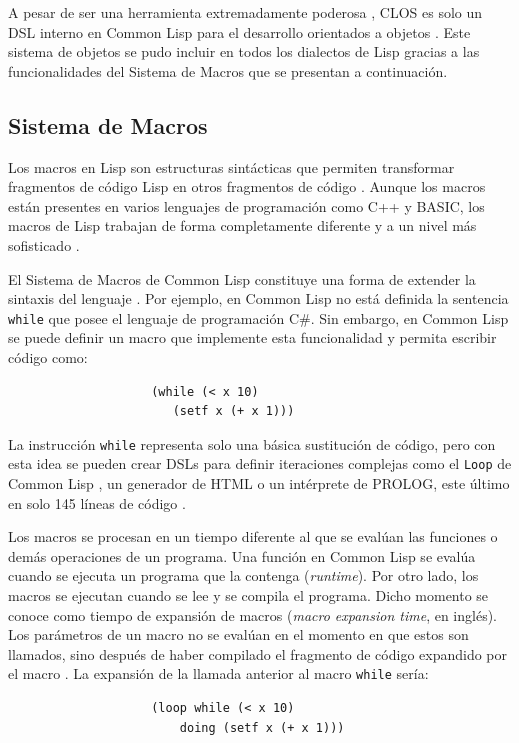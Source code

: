 A pesar de ser una herramienta extremadamente poderosa \cite{sonya}, CLOS es solo un DSL interno en Common Lisp para el desarrollo orientados a objetos \cite{sonya}. Este sistema de objetos se pudo incluir en todos los dialectos de Lisp gracias a las funcionalidades del Sistema de Macros que se presentan a continuación.
\subsection{Sistema de Macros}
\label{macros}
Los macros en Lisp son estructuras sintácticas que permiten transformar fragmentos de código Lisp en otros fragmentos de código \cite{Land-of-Lisp}. Aunque los macros están presentes en varios lenguajes de programación como C++ y BASIC, los macros de Lisp trabajan de forma completamente diferente y a un nivel más sofisticado \cite{Land-of-Lisp}.

El Sistema de Macros de Common Lisp constituye una forma de extender la sintaxis del lenguaje \cite{onlisp}. Por ejemplo, en Common Lisp no está definida la sentencia \texttt{while} que posee el lenguaje de programación C\#. Sin embargo, en Common Lisp se puede definir un macro que implemente esta funcionalidad y permita escribir código como:
\begin{verbatim}
                    (while (< x 10)                                  
                       (setf x (+ x 1)))
\end{verbatim}

La instrucción \texttt{while} representa solo una básica sustitución de código, pero con esta idea se pueden crear DSLs para definir iteraciones complejas como el \texttt{Loop} de Common Lisp  \cite{onlisp}, un generador de HTML \cite{ansi-common-lisp} o un intérprete de PROLOG, este último en solo 145 líneas de código \cite{onlisp}.

Los macros se procesan en un tiempo diferente al que se evalúan las funciones o demás operaciones de un programa. Una función en Common Lisp se evalúa cuando se ejecuta un programa que la contenga (\textit{runtime}). Por otro lado, los macros se ejecutan cuando se lee y se compila el programa. Dicho momento se conoce como tiempo de expansión de macros (\textit{macro expansion time}, en inglés). Los parámetros de un macro no se evalúan en el momento en que estos son llamados, sino después de haber compilado el fragmento de código expandido por el macro \cite{onlisp}. La expansión de la llamada anterior al macro \texttt{while} sería:

\begin{verbatim}
                    (loop while (< x 10)
                        doing (setf x (+ x 1)))
\end{verbatim}

